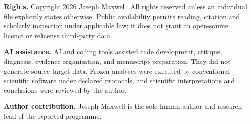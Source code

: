\documentclass[11pt,a4paper,oneside]{report}
\begin{document}
\textbf{Rights.} Copyright \textcopyright{} 2026 Joseph Maxwell. All rights reserved unless an individual file explicitly states otherwise. Public availability permits reading, citation and scholarly inspection under applicable law; it does not grant an open-source licence or relicense third-party data.

\textbf{AI assistance.} AI and coding tools assisted code development, critique, diagnosis, evidence organisation, and manuscript preparation. They did not generate source target data. Frozen analyses were executed by conventional scientific software under declared protocols, and scientific interpretations and conclusions were reviewed by the author.

\textbf{Author contribution.} Joseph Maxwell is the sole human author and research lead of the reported programme.


\end{document}
